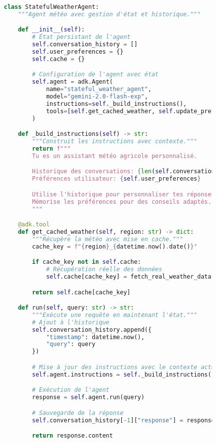 \begin{figure}[h]
\centering
\begin{lstlisting}[language=Python, caption=Gestion du cycle de vie avec états persistants]
class StatefulWeatherAgent:
    """Agent météo avec gestion d'état et historique."""

    def __init__(self):
        # État persistant de l'agent
        self.conversation_history = []
        self.user_preferences = {}
        self.cache = {}

        # Configuration de l'agent avec état
        self.agent = adk.Agent(
            name="stateful_weather_agent",
            model="gemini-2.0-flash-exp",
            instructions=self._build_instructions(),
            tools=[self.get_cached_weather, self.update_preferences]
        )

    def _build_instructions(self) -> str:
        """Construit les instructions avec contexte."""
        return f"""
        Tu es un assistant météo agricole personnalisé.

        Historique des conversations: {len(self.conversation_history)}
        Préférences utilisateur: {self.user_preferences}

        Utilise l'historique pour personnaliser tes réponses.
        Mémorise les préférences pour des conseils adaptés.
        """

    @adk.tool
    def get_cached_weather(self, region: str) -> dict:
        """Récupère la météo avec mise en cache."""
        cache_key = f"{region}_{datetime.now().date()}"

        if cache_key not in self.cache:
            # Récupération réelle des données
            self.cache[cache_key] = fetch_real_weather_data(region)

        return self.cache[cache_key]

    def run(self, query: str) -> str:
        """Exécute une requête en maintenant l'état."""
        # Ajout à l'historique
        self.conversation_history.append({
            "timestamp": datetime.now(),
            "query": query
        })

        # Mise à jour des instructions avec le contexte actuel
        self.agent.instructions = self._build_instructions()

        # Exécution de l'agent
        response = self.agent.run(query)

        # Sauvegarde de la réponse
        self.conversation_history[-1]["response"] = response.content

        return response.content
\end{lstlisting}
\end{figure}

